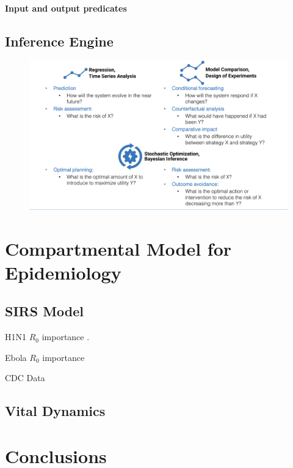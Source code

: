\documentclass[11pt]{article}
\begin{document}
\paragraph{Input and output predicates}

\subsection{Inference Engine}

\begin{figure}
  \includegraphics[width=\textwidth]{figs/table.pdf}
  \caption{}
  \label{Fig:InferenceClasses}
\end{figure}

\section{Compartmental Model for Epidemiology}

\subsection{SIRS Model}

H1N1 $R_0$ importance \cite{fraser2009pandemic}.

Ebola $R_0$ importance \cite{fisman2014early}

CDC Data \cite{cdc2019fluview}

\subsection{Vital Dynamics}

\section{Conclusions}
\end{document}

